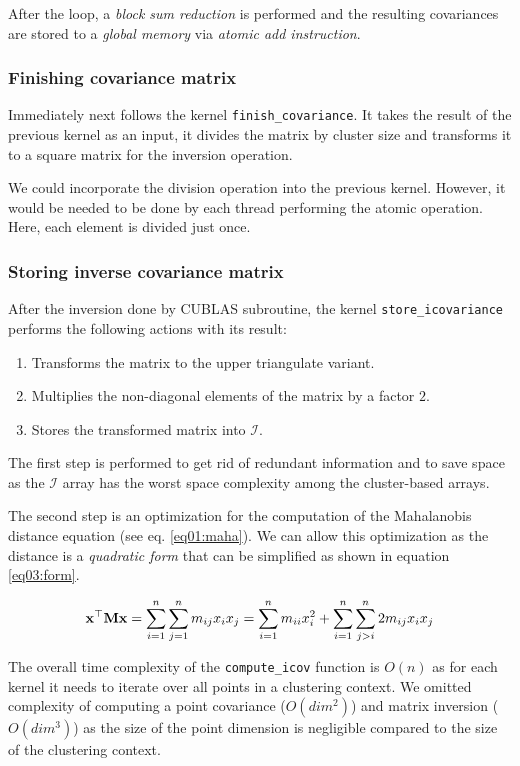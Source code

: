 After the loop, a \emph{block sum reduction} is performed and the resulting covariances are stored to a \emph{global memory} via \emph{atomic add instruction}.

\subsubsection{Finishing covariance matrix}
Immediately next follows the kernel \texttt{finish\_covariance}. It takes the result of the previous kernel as an input, it divides the matrix by cluster size and transforms it to a square matrix for the inversion operation.

We could incorporate the division operation into the previous kernel. However, it would be needed to be done by each thread performing the atomic operation. Here, each element is divided just once.

\subsubsection{Storing inverse covariance matrix}
After the inversion done by CUBLAS subroutine, the kernel \texttt{store\_icovariance} performs the following actions with its result:
\begin{enumerate}
	\item Transforms the matrix to the upper triangulate variant.
	\item Multiplies the non-diagonal elements of the matrix by a factor $2$.
	\item Stores the transformed matrix into $\mathcal{I}$.
\end{enumerate}

The first step is performed to get rid of redundant information and to save space as the $\mathcal{I}$ array has the worst space complexity among the cluster-based arrays.

The second step is an optimization for the computation of the Mahalanobis distance equation (see eq. \ref{eq01:maha}). We can allow this optimization as the distance is a \emph{quadratic form} that can be simplified as shown in equation \ref{eq03:form}.

\begin{equation}
\mathbf{x}^\top\mathbf{M}\mathbf{x} = \sum_{i=1}^{n}\sum_{j=1}^{n}{m_{ij}x_ix_j} = \sum_{i=1}^{n}{m_{ii}x_i^2} + \sum_{i=1}^{n}\sum_{j>i}^{n}{2m_{ij}x_ix_j}
\label{eq03:form}
\end{equation}


\begin{rem}
The overall time complexity of the \texttt{compute\_icov} function is $O(n)$ as for each kernel it needs to iterate over all points in a clustering context. We omitted complexity of computing a point covariance ($O(dim^2)$) and matrix inversion ($O(dim^3)$) as the size of the point dimension is negligible compared to the size of the clustering context.
\end{rem}

